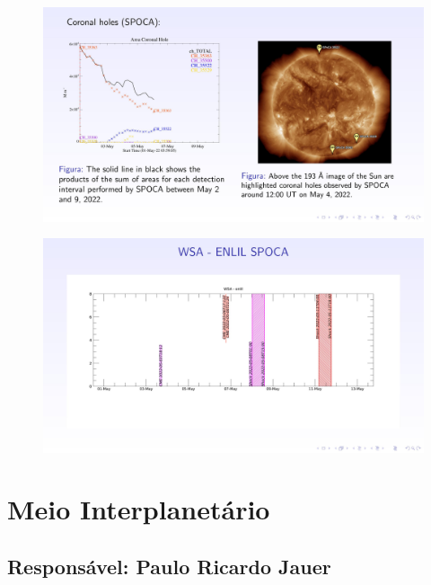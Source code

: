 \documentclass[11pt, oneside]{article}
\begin{document}
    \begin{figure}[H]
        \centering
        \includegraphics[width=14cm]{./figures/pt_outfileSun_0.jpg}
    \end{figure} 
 

    
    \begin{figure}[H]
        \centering
        \includegraphics[width=14cm]{./figures/pt_outfileSun_1.jpg}
    \end{figure} 
 

    \section{Meio Interplanetário} 
 \subsection{Responsável: Paulo Ricardo Jauer} 
 
\end{document}
